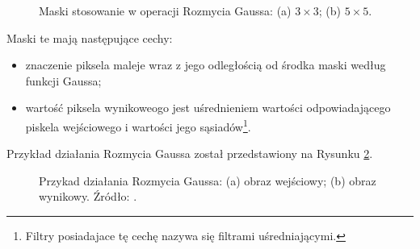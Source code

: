 \documentclass[a4paper,twocolumn,12pt]{article}
\begin{document}
\begin{figure}[!ht]
 \begin{center}
 \end{center}
 \caption{
  Maski stosowanie w operacji Rozmycia Gaussa:
  (a) $3 \times 3$;
  (b) $5 \times 5$.
 }
 \label{fig:gauss_matrices}
\end{figure}

Maski te mają następujące cechy:

\begin{itemize}
 \item znaczenie piksela maleje wraz z jego odległością od środka maski według funkcji Gaussa;
 \item wartość piksela wynikoweogo jest uśrednieniem wartości odpowiadającego piskela wejściowego i wartości jego sąsiadów\footnote{Filtry posiadajace tę cechę nazywa się filtrami uśredniającymi.}.
\end{itemize}

Przykład działania Rozmycia Gaussa został przedstawiony na Rysunku \ref{fig:gauss_example}.

\begin{figure}[!ht]
 \begin{center}
 \end{center}
 \caption{
  Przykad działania Rozmycia Gaussa:
  (a) obraz wejściowy;
  (b) obraz wynikowy.
  Źródło: \cite{gauss}.
 }
 \label{fig:gauss_example}
\end{figure}
\end{document}
